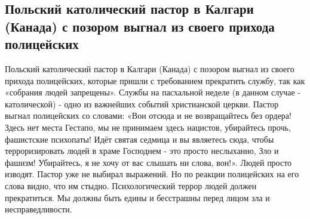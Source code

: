  
 
 
 
 

\subsection{Польский католический пастор в Калгари (Канада) с позором выгнал из своего прихода полицейских}

Польский католический пастор в Калгари (Канада) с позором выгнал из своего
прихода полицейских, которые пришли с требованием прекратить службу, так как
«собрания людей запрещены». Службы на пасхальной неделе (в данном случае -
католической) - одно из важнейших событий христианской церкви. Пастор выгнал
полицейских со словами: «Вон отсюда и не возвращайтесь без ордера! Здесь нет
места Гестапо, мы не принимаем здесь нацистов, убирайтесь прочь, фашистские
психопаты! Идёт святая седмица и вы являетесь сюда, чтобы терроризировать людей
в храме Господнем - это просто неслыханно, Зло и фашизм! Убирайтесь, я не хочу
от вас слышать ни слова, вон!».  Людей просто изводят. Пастор уже не выбирал
выражений. Но по реакции полицейских на его слова видно, что им стыдно.
Психологический террор людей должен прекратиться. Мы должны быть едины и
бесстрашны перед лицом зла и несправедливости.

